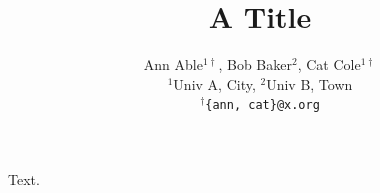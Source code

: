 \documentclass{article}
\begin{document}
\title{A Title}
\author{Ann Able$^{1\dagger}$, Bob Baker$^2$, Cat Cole$^{1\dagger}$ \\
$^1$Univ A, City, $^2$Univ B, Town \\
$^\dagger$\texttt{\{ann, cat\}@x.org}}
\maketitle
Text.
\end{document}
